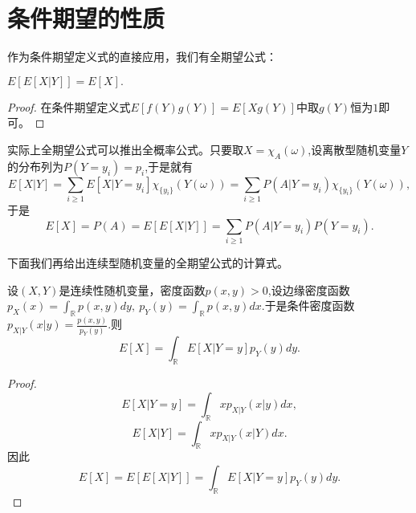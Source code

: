 \documentclass[lang=cn,10pt]{elegantbook}
\begin{document}
	\section{条件期望的性质}
	作为条件期望定义式的直接应用，我们有全期望公式：
	\begin{theorem}[全期望公式]
		\(E[E[X|Y]]=E[X].\)
	\end{theorem}
	\begin{proof}
		在条件期望定义式\(E[f(Y)g(Y)]=E[Xg(Y)]\)中取\(g(Y)\)恒为\(1\)即可。
	\end{proof}
	\begin{note}
		实际上全期望公式可以推出全概率公式。只要取\(X=\chi_{A}(\omega)\),设离散型随机变量\(Y\)的分布列为\(P(Y=y_i)=p_i\),于是就有
		\[E[X|Y]=\sum_{i\ge1}E[X|Y=y_i]\chi_{\{y_i\}}(Y(\omega))=\sum_{i\ge1}P(A|Y=y_i)\chi_{\{y_i\}}(Y(\omega)),\]
		于是\[E[X]=P(A)=E[E[X|Y]]=\sum_{i\ge1}P(A|Y=y_i)P(Y=y_i).\]
	\end{note}
	下面我们再给出连续型随机变量的全期望公式的计算式。
	\begin{proposition}[连续型随机变量的全期望公式]
		设\((X,Y)\)是连续性随机变量，密度函数\(p(x,y)>0\),设边缘密度函数\(p_X(x)=\int_\mathbb{R}p(x,y)dy,\ p_Y(y)=\int_\mathbb{R}p(x,y)dx.\)于是条件密度函数\(p_{X|Y}(x|y)=\frac{p(x,y)}{p_Y(y)}\).则
		\[E[X]=\int_\mathbb{R}E[X|Y=y]p_Y(y)dy.\]
	\end{proposition}
	\begin{proof}
		\[E[X|Y=y]=\int_\mathbb{R}xp_{X|Y}(x|y)dx,\]
		\[E[X|Y]=\int_\mathbb{R}xp_{X|Y}(x|Y)dx.\]
		因此
		\[E[X]=E[E[X|Y]]=\int_\mathbb{R}E[X|Y=y]p_Y(y)dy.\]
	\end{proof}
	
\end{document}
